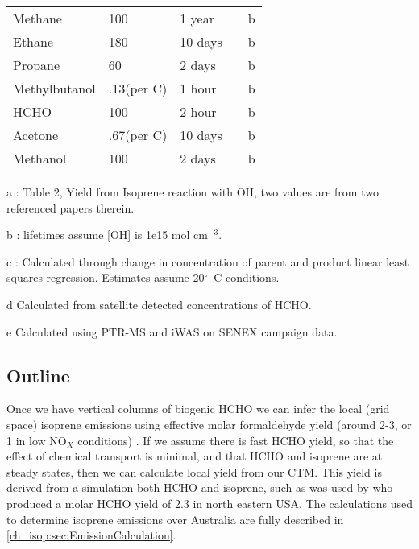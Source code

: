 \begin{table}
\begin{threeparttable}
\begin{tabular}{  l  l  l  l  l  }
	Methane 	  & 100             & 1 year  &             & b     \\ 
	Ethane            & 180             & 10 days &             & b     \\ 
	Propane           & 60              & 2 days  &             & b     \\ 
	Methylbutanol     & .13(per C)      & 1 hour  &             & b     \\ 
	HCHO              & 100             & 2 hour  &             & b     \\ 
	Acetone           & .67(per C)      & 10 days &             & b     \\ 
	Methanol          & 100             & 2 days  &             & b     \\ %
	\bottomrule
    \end{tabular}
    \begin{tablenotes} %
      \item a \citet{AtkinsonArey2003}: Table 2, Yield from Isoprene reaction with OH, two values are from two referenced papers therein.
      \item b \citet{Palmer2003}: lifetimes assume [OH] is 1e15 mol cm$^{-3}$.
      \item c \citep{Lee2006}: Calculated through change in concentration of parent and product linear least squares regression.
	Estimates assume 20$^\circ$~C conditions.
      \item d Calculated from satellite detected concentrations of HCHO.
      \item e Calculated using PTR-MS and iWAS on SENEX campaign data.
    \end{tablenotes}
    \label{ch_isop:tab:VOCLiteratureYields}
  \end{threeparttable} \end{table}

  \subsection{Outline}
    Once we have vertical columns of biogenic HCHO we can infer the local (grid space) isoprene emissions using effective molar formaldehyde yield (around 2-3, or 1 in low NO$_X$ conditions) \citep{Palmer2003,Marais2013,Bauwens2016}.
    If we assume there is fast HCHO yield, so that the effect of chemical transport is minimal, and that HCHO and isoprene are at steady states, then we can calculate local yield from our CTM.
    This yield is derived from a simulation both HCHO and isoprene, such as was used by \citet{Millet2006} who produced a molar HCHO yield of 2.3 in north eastern USA.
    The calculations used to determine isoprene emissions over Australia are fully described in \ref{ch_isop:sec:EmissionCalculation}.
    
